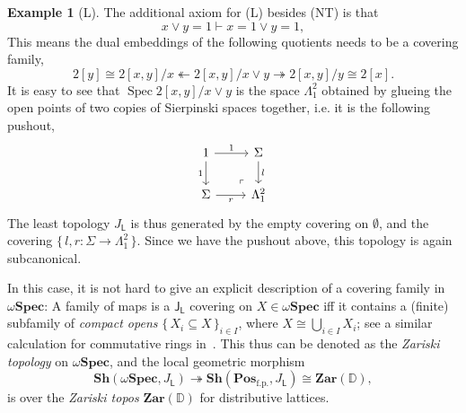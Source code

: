 \documentclass[12pt]{amsart}
\theoremstyle{definition}
\newtheorem{example}[theorem]{Example}
\newcommand{\mb}[1]{\mathbf{#1}}
\newcommand{\mbb}[1]{\mathbb{#1}}
\newcommand{\mr}[1]{\mathrm{#1}}
\newcommand{\ms}[1]{\mathsf{#1}}
\newcommand{\Pos}{\mb{Pos}}
\newcommand{\sh}{\mb{Sh}}
\newcommand{\set}[1]{\{\,#1\,\}}
\newcommand{\surj}{\twoheadrightarrow}
\newcommand{\fp}{_{\mr{f.p.}}}
\newcommand{\emp}{\emptyset}
\newcommand{\wSpec}{\omega\mb{Spec}}
\newcommand{\spec}{\operatorname{Spec}}
\begin{document}
\begin{example}[L]
  The additional axiom for (L) besides (NT) is that 
  \[ x \vee y = 1 \vdash x = 1 \vee y = 1, \] 
  This means the dual embeddings of the following quotients needs to be a covering family,
  \[ 2[y] \cong 2[x,y]/x \twoheadleftarrow 2[x,y]/x\vee y \surj 2[x,y]/y \cong 2[x]. \]
  It is easy to see that $\spec 2[x,y]/x \vee y$ is the space $\Lambda^2_1$ obtained by glueing the open points of two copies of Sierpinski spaces together, i.e. it is the following pushout,
  \[
  \begin{tikzcd}
    1 \ar[d, "1"'] \ar[r, "1"] & \Sigma \ar[d, "l"] \\ 
    \Sigma \ar[r, "r"'] & \Lambda^2_1
    \arrow["\lrcorner"{anchor=center, pos=0.125, rotate=180}, draw=none, from=2-2, to=1-1]    
  \end{tikzcd}
  \]
  The least topology $J_{\ms L}$ is thus generated by the empty covering on $\emp$, and the covering $\set{l,r : \Sigma \to \Lambda^2_1}$. Since we have the pushout above, this topology is again subcanonical. 
  
  In this case, it is not hard to give an explicit description of a covering family in $\wSpec$: A family of maps is a $\ms J_{\ms L}$ covering on $X \in \wSpec$ iff it contains a (finite) subfamily of \emph{compact opens} $\set{X_i\subseteq X}_{i\in I}$, where $X \cong \bigcup_{i\in I}X_i$; see a similar calculation for commutative rings in~\cite[VIII. 6]{maclane2012sheaves}. This thus can be denoted as the \emph{Zariski topology} on $\wSpec$, and the local geometric morphism
  \[ \sh(\wSpec,J_{\ms L}) \surj \sh(\Pos\fp,J_{\ms L}) \cong \mb{Zar}(\mbb D), \]
  is over the \emph{Zariski topos} $\mb{Zar}(\mbb D)$ for distributive lattices.
\end{example}
\end{document}
